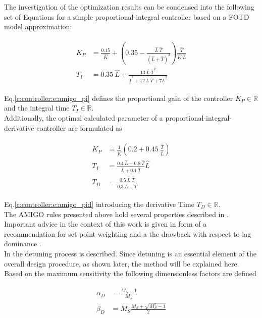 The investigation of the optimization results can be condensed into the following set of Equations for a simple proportional-integral controller based on a FOTD model approximation:

\begin{align}
\begin{split}
K_P &= \frac{0.15}{\hat{K}}+ \left(0.35 - \frac{\hat{L}~\hat{T}}{\left( \hat{L}+\hat{T} \right)^2} \right) \frac{\hat{T}}{\hat{K}~\hat{L}} \\
T_I &= 0.35~ \hat{L} + \frac{13~\hat{L}~\hat{T}^2}{\hat{T}^2 + 12~\hat{L}~\hat{T}+7 \hat{L}^2}
\end{split}
\label{c:controller:e:amigo_pi}
\end{align}

Eq.\ref{c:controller:e:amigo_pi} defines the proportional gain of the controller $K_P \in \mathbb{R}$ and the integral time $T_I \in \mathbb{R}$.\\

Additionally, the optimal calculated parameter of a proportional-integral-derivative controller are formulated as

\begin{align}
\begin{split}
K_P &= \frac{1}{\hat{K}} \left( 0.2 + 0.45~ \frac{\hat{T}}{\hat{L}}\right)\\
T_I &= \frac{0.4~\hat{L}+0.8~\hat{T}}{\hat{L}+0.1~\hat{T}}\hat{L}\\
T_D &= \frac{0.5~\hat{L}~\hat{T}}{0.3~\hat{L}+\hat{T}}
\end{split}
\label{c:controller:e:amigo_pid}
\end{align}

Eq.\ref{c:controller:e:amigo_pid} introducing the derivative Time $T_D \in \mathbb{R}$.\\

The AMIGO rules presented above hold several properties described in \cite[p.229 ff.]{Astrom2006}. Important advice in the context of this work is given in form of a recommendation for set-point weighting \cite[p.229 f., p.235 ff.]{Astrom2006} and a the drawback with respect to lag dominance \cite[p.231 ff.]{Astrom2006}.\\ 
In \cite[p.253 ff.]{Astrom2006} the detuning process is described. Since detuning is an essential element of the overall design procedure, as shown later, the method will be explained here. Based on the maximum sensitivity the following dimensionless factors are defined 

\begin{align}
\begin{split}
\alpha_D &= \frac{M_S-1}{M_S}\\
\beta_D &= M_S \frac{M_S+\sqrt{M_S^2 -1}}{2} 
\end{split}
\label{c:controller:e:amigo_factor}
\end{align}


